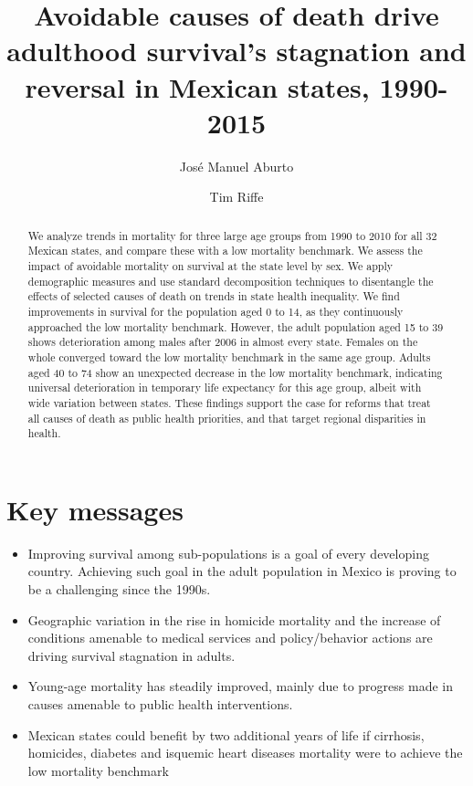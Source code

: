 \documentclass[11.5pt]{article}
\title{Avoidable causes of death drive adulthood survival's stagnation and reversal in Mexican states, 1990-2015}
\author[1]{Jos\'e Manuel Aburto}
\author[2]{Tim Riffe}
\affil[1]{European Doctoral School of Demography}
\affil[1,2]{Max Planck Institute for Demographic Research}
\begin{document}
\maketitle

\begin{abstract}
We analyze trends in mortality for three large age groups from 1990 to 2010 for all 32 Mexican states, and compare these with a low mortality benchmark. We assess the impact of avoidable mortality on survival at the state level by sex. We apply demographic measures and use standard decomposition techniques to disentangle the effects of selected causes of death on trends in state health inequality. We find improvements in survival for the population aged 0 to 14, as they continuously approached the low mortality benchmark. However, the adult population aged 15 to 39 shows deterioration among males after 2006 in almost every state. Females on the whole converged toward the low mortality benchmark in the same age group. Adults aged 40 to 74 show an unexpected decrease in the low mortality benchmark, indicating universal deterioration in temporary life expectancy for this age group, albeit with wide variation between states. These findings support the case for reforms that treat all causes of death as public health priorities, and that target regional disparities in health.

\end{abstract}

\section*{Key messages}
\begin{itemize}
\item Improving survival among sub-populations is a goal of every developing country. Achieving such goal in the adult population in Mexico is proving to be a challenging since the 1990s.
\item Geographic variation in the rise in homicide mortality and the increase of conditions amenable to medical services and policy/behavior actions are driving survival stagnation in adults.
\item Young-age mortality has steadily improved, mainly due to progress made in causes amenable to public health interventions.
\item Mexican states could benefit by two additional years of life if  cirrhosis, homicides, diabetes and isquemic heart diseases mortality were to achieve the low mortality benchmark 
\end{itemize}
\end{document}
